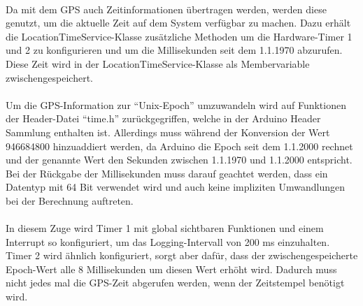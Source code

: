 \paragraph{}
Da mit dem GPS auch Zeitinformationen übertragen werden, werden diese genutzt, um die aktuelle Zeit auf dem System verfügbar zu machen. Dazu erhält die LocationTimeService-Klasse zusätzliche Methoden um die Hardware-Timer 1 und 2 zu konfigurieren und um die Millisekunden seit dem 1.1.1970 abzurufen. Diese Zeit wird in der LocationTimeService-Klasse als Membervariable zwischengespeichert.
\paragraph{}
Um die GPS-Information zur \enquote{Unix-Epoch} umzuwandeln wird auf Funktionen der Header-Datei \enquote{time.h} zurückgegriffen, welche in der Arduino Header Sammlung enthalten ist. Allerdings muss während der Konversion der Wert 946684800 hinzuaddiert werden, da Arduino die Epoch seit dem 1.1.2000 rechnet und der genannte Wert den Sekunden zwischen 1.1.1970 und 1.1.2000 entspricht. Bei der Rückgabe der Millisekunden muss darauf geachtet werden, dass ein Datentyp mit 64 Bit verwendet wird und auch keine impliziten Umwandlungen bei der Berechnung auftreten.
\paragraph{}
In diesem Zuge wird Timer 1 mit global sichtbaren Funktionen und einem Interrupt so konfiguriert, um das Logging-Intervall von 200 ms einzuhalten. Timer 2 wird ähnlich konfiguriert, sorgt aber dafür, dass der zwischengespeicherte Epoch-Wert alle 8 Millisekunden um diesen Wert erhöht wird. Dadurch muss nicht jedes mal die GPS-Zeit abgerufen werden, wenn der Zeitstempel benötigt wird.

